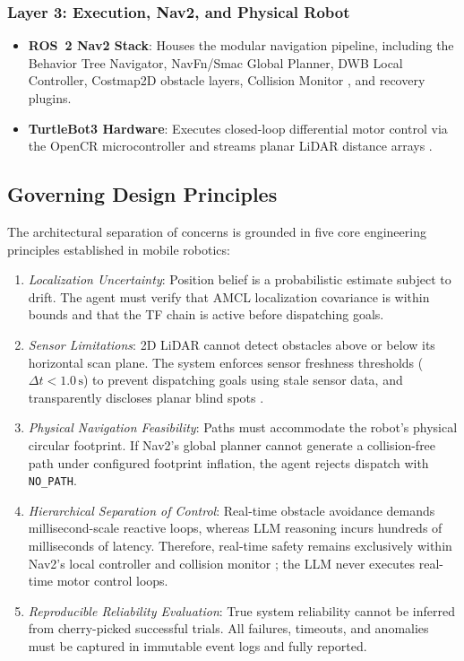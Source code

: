 \documentclass[conference]{IEEEtran}
\begin{document}
\subsubsection{Layer 3: Execution, Nav2, and Physical Robot}
\begin{itemize}
    \item \textbf{ROS~2 Nav2 Stack}: Houses the modular navigation pipeline, including the Behavior Tree Navigator, NavFn/Smac Global Planner, DWB Local Controller, Costmap2D obstacle layers, Collision Monitor \cite{Nav2CollisionMonitor}, and recovery plugins.
    \item \textbf{TurtleBot3 Hardware}: Executes closed-loop differential motor control via the OpenCR microcontroller and streams planar LiDAR distance arrays \cite{RobotisTurtlebot3}.
\end{itemize}

\subsection{Governing Design Principles}
The architectural separation of concerns is grounded in five core engineering principles established in mobile robotics:
\begin{enumerate}
    \item \textit{Localization Uncertainty}: Position belief is a probabilistic estimate subject to drift. The agent must verify that AMCL localization covariance is within bounds and that the TF chain is active before dispatching goals.
    \item \textit{Sensor Limitations}: 2D LiDAR cannot detect obstacles above or below its horizontal scan plane. The system enforces sensor freshness thresholds ($\Delta t < 1.0\,\text{s}$) to prevent dispatching goals using stale sensor data, and transparently discloses planar blind spots \cite{RobotisTurtlebot3}.
    \item \textit{Physical Navigation Feasibility}: Paths must accommodate the robot's physical circular footprint. If Nav2's global planner cannot generate a collision-free path under configured footprint inflation, the agent rejects dispatch with \texttt{NO\_PATH}.
    \item \textit{Hierarchical Separation of Control}: Real-time obstacle avoidance demands millisecond-scale reactive loops, whereas LLM reasoning incurs hundreds of milliseconds of latency. Therefore, real-time safety remains exclusively within Nav2's local controller and collision monitor \cite{Nav2CollisionMonitor}; the LLM never executes real-time motor control loops.
    \item \textit{Reproducible Reliability Evaluation}: True system reliability cannot be inferred from cherry-picked successful trials. All failures, timeouts, and anomalies must be captured in immutable event logs and fully reported.
\end{enumerate}
\end{document}
